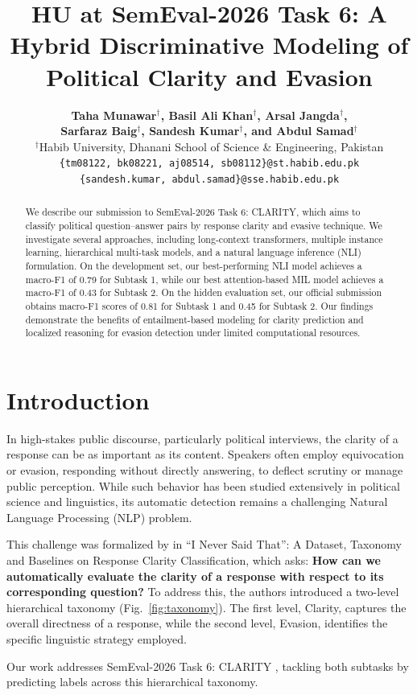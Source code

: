 \documentclass[11pt]{article}
\title{HU at SemEval-2026 Task 6: A Hybrid Discriminative Modeling of Political Clarity and Evasion}
\author{
  \textbf{Taha Munawar$^\dag$, Basil Ali Khan$^\dag$, Arsal Jangda$^\dag$,} \\
  \textbf{Sarfaraz Baig$^\dag$, Sandesh Kumar$^\dag$, \textnormal{and} Abdul Samad$^\dag$} \\
  $^\dag$Habib University, Dhanani School of Science \& Engineering, Pakistan \\
  \texttt{\{tm08122, bk08221, aj08514, sb08112\}@st.habib.edu.pk} \\
  \texttt{\{sandesh.kumar, abdul.samad\}@sse.habib.edu.pk}
}
\begin{document}
\maketitle

\begin{abstract}
We describe our submission to SemEval-2026 Task 6: CLARITY, which aims to classify political question--answer pairs by response clarity and evasive technique. We investigate several approaches, including long-context transformers, multiple instance learning, hierarchical multi-task models, and a natural language inference (NLI) formulation. On the development set, our best-performing NLI model achieves a macro-F1 of 0.79 for Subtask 1, while our best attention-based MIL model achieves a macro-F1 of 0.43 for Subtask 2. On the hidden evaluation set, our official submission obtains macro-F1 scores of 0.81 for Subtask 1 and 0.45 for Subtask 2. Our findings demonstrate the benefits of entailment-based modeling for clarity prediction and localized reasoning for evasion detection under limited computational resources.
\end{abstract}

\section{Introduction}
In high-stakes public discourse, particularly political interviews, the clarity of a response can be as important as its content. Speakers often employ equivocation or evasion, responding without directly answering, to deflect scrutiny or manage public perception. While such behavior has been studied extensively in political science and linguistics, its automatic detection remains a challenging Natural Language Processing (NLP) problem.

This challenge was formalized by \citet{b4} in ``I Never Said That'': A Dataset, Taxonomy and Baselines on Response Clarity Classification, which asks: \textbf{How can we automatically evaluate the clarity of a response with respect to its corresponding question?} To address this, the authors introduced a two-level hierarchical taxonomy (Fig.~\ref{fig:taxonomy}). The first level, Clarity, captures the overall directness of a response, while the second level, Evasion, identifies the specific linguistic strategy employed.

Our work addresses SemEval-2026 Task 6: CLARITY \citep{b10}, tackling both subtasks by predicting labels across this hierarchical taxonomy.
\end{document}
